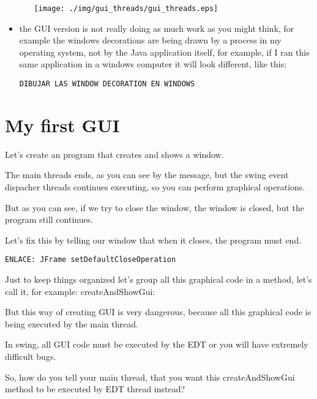 \documentclass[a4paper, 9pt]{extarticle}
\begin{document}
\begin{itemize}
\begin{itemize}
        \begin{center}
          \texttt{[image: ./img/gui\_threads/gui\_threads.eps]}
        \end{center}

    \end{itemize}

  \item the GUI version is not really doing as much work as you might think,
    for example the windows decorations are being drawn by a process in my
    operating system, not by the Java application itself, for example, if I ran
    this same application in a windows computer it will look different, like
    this:

    \verb+DIBUJAR LAS WINDOW DECORATION EN WINDOWS+

\end{itemize}




\section{My first GUI}

Let's create an program that creates and shows a window.


The main threads ends, as you can see by the message, but the swing event
dispacher threads continues executing, so you can perform graphical operations.

But as you can see, if we try to close the window, the window is closed, but
the program still continues.

Let's fix this by telling our window that when it closes, the program must end.

\verb+ENLACE: JFrame setDefaultCloseOperation+


Just to keep things organized let's group all this graphical code in a method,
let's call it, for example: createAndShowGui:


But this way of creating GUI is very dangerous, because all this graphical code
is being executed by the main thread.

In swing, all GUI code must be executed by the EDT or you will have extremely
difficult bugs.

So, how do you tell your main thread, that you want this createAndShowGui
method to be executed by EDT thread instead?
\end{document}
